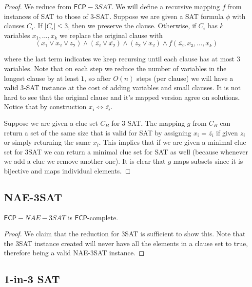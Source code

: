 \documentclass[runningheads,a4paper]{llncs}
\begin{document}
\begin{proof}
We reduce from $\mathsf{FCP}-3SAT$. We will define a recursive mapping $f$ from instances of SAT to those of 3-SAT. Suppose we are given a SAT formula $\phi$ with clauses $C_i$. If $|C_i| \leq 3$, then we preserve the clause. Otherwise, if $C_i$ has $k$ variables $x_1,...,x_k$ we replace the original clause with 
\[ 
(x_1 \vee x_2 \vee z_2) \wedge (\overline{z_2} \vee \overline{x_2}) \wedge (z_2 \vee x_2) \wedge f(\overline{z_2}, x_3, ..., x_k) 
\]

where the last term indicates we keep recursing until each clause has at most $3$ variables. Note that on each step we reduce the number of variables in the longest clause by at least $1$, so after $O(n)$ steps (per clause) we will have a valid 3-SAT instance at the cost of adding variables and small clauses. It is not hard to see that the original clause and it's mapped version agree on solutions. Notice that by construction $x_i \iff \overline{z_i}$. 

Suppose we are given a clue set $C_B$ for 3-SAT. The mapping $g$ from $C_B$ can return a set of the same size that is valid for SAT by assigning $x_i = \overline{z_i}$ if given $z_i$ or simply returning the same $x_i$. This implies that if we are given a minimal clue set for 3SAT we can return a minimal clue set for SAT as well (because whenever we add a clue we remove another one). It is clear that $g$ maps subsets since it is bijective and maps individual elements. 

\end{proof}

\subsection{NAE-3SAT}

\begin{theorem}
$\mathsf{FCP}-NAE-3SAT$ is $\mathsf{FCP}$-complete. 
\end{theorem} 

\begin{proof}
We claim that the reduction for 3SAT is sufficient to show this. Note that the 3SAT instance created will never have all the elements in a clause set to true, therefore being a valid NAE-3SAT instance. 
\end{proof}

\subsection{1-in-3 SAT}
\end{document}

